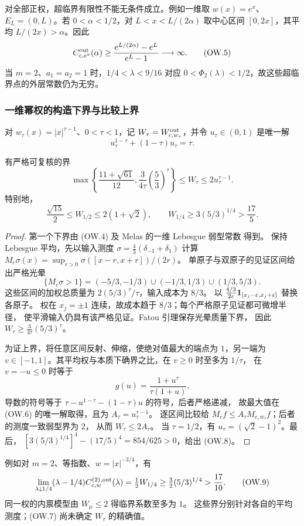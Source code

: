 对全部正权，超临界有限性不能无条件成立。例如一维取 $w(x)=e^x$、
$E_L=(0,L)$。若 $0<\alpha<1/2$，对
$L<x<L/(2\alpha)$ 取中心区间 $[0,2x]$，其平均 $L/(2x)>\alpha$。因此
\[C^{\rm out}_{c,e^x}(\alpha)\ge
\frac{e^{L/(2\alpha)}-e^L}{e^L-1}\longrightarrow\infty.
\tag{OW.5}\]
当 $m=2$、$a_1=a_2=1$ 时，$1/4<\lambda<9/16$ 对应
$0<\Phi_2(\lambda)<1/2$，故这些超临界点的外层常数仍为无穷。

\subsubsection{一维幂权的构造下界与比较上界}
对 $w_\tau(x)=|x|^{\tau-1}$、$0<\tau<1$，记
$W_\tau=W^{\rm out}_{c,w_\tau}$，并令 $u_\tau\in(0,1)$ 是唯一解
\[u_\tau^{1-\tau}+(1-\tau)u_\tau=\tau.\tag{OW.6}\]
\begin{proposition}\label{prop:atomic-power-bound}
有严格可复核的界
\[\max\left\{\frac{11+\sqrt{61}}{12},
\frac3{4\tau}\left(\frac53\right)^\tau\right\}
\le W_\tau\le2u_\tau^{\tau-1}.\tag{OW.7}\]
特别地，
\[\frac{\sqrt{15}}2\le W_{1/2}\le2(1+\sqrt2),\qquad
W_{1/4}\ge3(5/3)^{1/4}>\frac{17}5.\tag{OW.8}\]
\end{proposition}
\begin{proof}
第一个下界由 (OW.4) 及 Melas 的一维 Lebesgue 弱型常数
\cite{Melas2003} 得到。
保持 Lebesgue 平均，先以输入测度
$\sigma=\frac43(\delta_{-1}+\delta_1)$ 计算
$M_c\sigma(x)=\sup_{r>0}\sigma([x-r,x+r])/(2r)$。
单原子与双原子的见证区间给出严格光晕
\[\{M_c\sigma>1\}=(-5/3,-1/3)\cup(-1/3,1/3)\cup(1/3,5/3).\]
这些区间的加权总质量为 $2(5/3)^\tau/\tau$，输入成本为 $8/3$。
以 $\frac{4/3}{2\varepsilon}\mathbf 1_{[x_j-\varepsilon,x_j+\varepsilon]}$ 替换各原子。
权在 $x_j=\pm1$ 连续，故成本趋于 $8/3$；每个严格原子见证都可微增半径，
使平滑输入仍具有该严格见证。Fatou 引理保存光晕质量下界，
因此 $W_\tau\ge\frac3{4\tau}(5/3)^\tau$。

为证上界，将任意区间反射、伸缩，使绝对值最大的端点为 $1$，另一端为
$v\in[-1,1]$。其平均权与本质下确界之比，在 $v\ge0$ 时至多为 $1/\tau$，
在 $v=-u\le0$ 时等于
\[g(u)=\frac{1+u^\tau}{\tau(1+u)}.
\]
导数的符号等于 $\tau-u^{1-\tau}-(1-\tau)u$ 的符号，后者严格递减，
故最大值在 (OW.6) 的唯一解取得，且为 $A_\tau=u_\tau^{\tau-1}$。
逐区间比较给 $M_cf\le A_\tau M_{c,w_\tau}f$；后者的测度一致弱型界为 $2$，
从而 $W_\tau\le2A_\tau$。
当 $\tau=1/2$，有 $u_\tau=(\sqrt2-1)^2$。最后，
$[3(5/3)^{1/4}]^4-(17/5)^4=854/625>0$，给出 (OW.8)。
\end{proof}

例如对 $m=2$、等指数、$w=|x|^{-3/4}$，有
\[\lim_{\lambda\downarrow1/4}(\lambda-1/4)
C^{(2),\rm out}_{c,w}(\lambda)
=\tfrac12W_{1/4}\ge\tfrac32(5/3)^{1/4}>\frac{17}{10}.\tag{OW.9}\]
同一权的内禀模型由 $W_\mu\le2$ 得临界系数至多为 $1$。
这些界分别针对各自的平均测度；(OW.7) 尚未确定 $W_\tau$ 的精确值。
